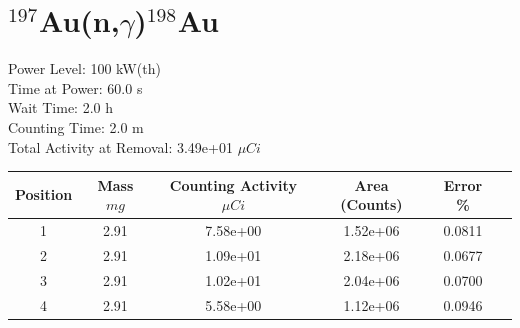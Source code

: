 \newpage

\section*{ $^{197}$Au(n,$\gamma$)$^{198}$Au }

Power Level: 100 kW(th) \\
Time at Power: 60.0 s \\
Wait Time:  2.0 h \\
Counting Time:  2.0 m \\
Total Activity at Removal: 3.49e+01 $\mu Ci$

\begin{table}[h]
\centering
\begin{tabular}{ |c|c|c|c|c|c| }
 \hline
 Position & Mass $mg$ & Counting Activity $\mu Ci$ & Area (Counts) & Error \% \\
 \hline 
 1 & 2.91 & 7.58e+00 & 1.52e+06 & 0.0811 \\ 
\hline
 2 & 2.91 & 1.09e+01 & 2.18e+06 & 0.0677 \\ 
\hline
 3 & 2.91 & 1.02e+01 & 2.04e+06 & 0.0700 \\ 
\hline
 4 & 2.91 & 5.58e+00 & 1.12e+06 & 0.0946 \\ 
\hline
\end{tabular}
\end{table}

